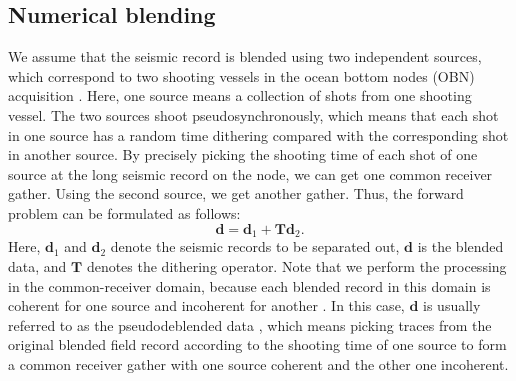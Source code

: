 \subsection{Numerical blending}
We assume that the seismic record is blended using two independent sources, which correspond to two shooting vessels in the ocean bottom nodes (OBN) acquisition \cite[]{obn}. Here, one source means a collection of shots from one shooting vessel. The
two sources shoot pseudosynchronously, which means that each shot in one source has a random time dithering compared with the corresponding shot in another source.  By precisely picking the shooting time of each shot of one source at the long seismic record on the node, we can get one common receiver gather. Using the second source, we get another gather.
Thus, the forward problem can be formulated as follows:
\begin{equation}
\label{eq:inv}
\mathbf{d}=\mathbf{d}_1+\mathbf{Td}_2.
\end{equation}
Here, $\mathbf{d}_1$ and $\mathbf{d}_2$ denote the seismic records to be separated out, $\mathbf{d}$ is the blended data, and $\mathbf{T}$ denotes the dithering operator. Note that we perform the processing in the common-receiver domain, because each blended record in this domain is coherent for one source and incoherent for another \cite[]{gary}. In this case, $\mathbf{d}$ is usually referred to as the pseudodeblended data \cite[]{mahdad2011}, which means picking traces from the original blended field record according to the shooting time of one source to form a common receiver gather with one source coherent and the other one incoherent. 
